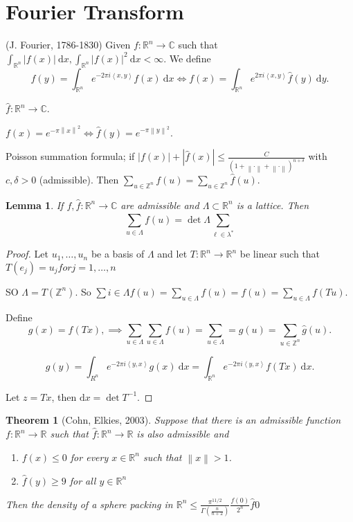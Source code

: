 \documentclass{report}
\newcommand{\R}{\mathbb{R}}
\newcommand{\C}{\mathbb{C}}
\newcommand{\Z}{\mathbb{Z}}
\newcommand{\df}{\mathrm{d}}
\newcommand{\idf}{\ \mathrm{d}}
\newcommand{\inner}[2]{\left\langle #1, #2\right\rangle}
\newcommand{\norm}[1]{\left\| #1 \right\|}
\newcommand{\abs}[1]{\left| #1 \right|}
\newtheorem{theorem}{Theorem}[section]
\newtheorem{lemma}{Lemma}[section]
\theoremstyle{definition}
\theoremstyle{remark}
\numberwithin{equation}{section}
\begin{document}
\section{Fourier Transform}
(J. Fourier, 1786-1830)
Given $f: \R^n \to \C$ such that $\int_{\R^n} |f(x)| \idf x, \int_{\R^n} |f(x)|^2 \idf x < \infty$. We define \[\widehat{f}(y)=\int_{\R^n} e^{-2\pi i \inner{x}{y}}f(x) \idf x \iff f(x) = \int_{\R^n}e^{2\pi i \inner{x}{y}} \widehat{f}(y) \idf y.\]

$\widehat{f}: \R^n \to \C$.

$f(x) = e^{-\pi\norm{x}^2} \iff \widehat{f}(y) = e^{-\pi\norm{y}^2}$.

Poisson summation formula; if $|f(x)| + \abs{\widehat{f}(x)} \leq \frac{C}{(1 + \norm{\cdot} + \norm{\cdot})^{n + \delta}}$ with $c, \delta > 0$ (admissible). Then $\sum_{u \in \Z^n} f(u) = \sum_{u \in \Z^n}\widehat{f}(u)$.

\begin{lemma}
    If $f, \widehat{f}: \R^n \to \C$ are admissible and $\Lambda \subset \R^n$ is a lattice. Then \[\sum_{u\in \Lambda}^{}f(u) = \det \Lambda \sum_{\ell \in \lambda^*}^{}\]
\end{lemma}
\begin{proof}
    Let $u_1, \ldots, u_n$ be a basis of $\Lambda$ and let $T: \R^n \to \R^n$ be linear such that $T(e_j) = u_j for j = 1, \ldots, n$

    SO $\Lambda = T(\Z^n)$. So $\sum i \in \Lambda f(u) = \sum_{u \in \Lambda} f(u) = f(u) = \sum_{u \in \Lambda} f(Tu)$.
    
    Define \[g(x) = f(Tx), \implies \sum_{u \in \Lambda} \sum_{u \in \Lambda} f(u) = \sum_{u \in \Lambda} = g(u) = \sum_{u \in \Z^n} \widehat{g}(u).\]

    \[\widehat{g}(y) = \int_{R^n} e^{-2\pi i \inner{y}{x}} g(x) \idf x = \int_{\R^n} e^{-2\pi i \inner{y}{x}}f(Tx)\idf x.\]

    Let $z = Tx$, then $\df x = \det T^{-1}$.


\end{proof}

\begin{theorem}[Cohn, Elkies, 2003]
    Suppose that there is an admissible function $f: \R^n \to \R$ such that $\widehat{f}: \R^n \to \R$ is also admissible and \begin{enumerate}
        \item $f(x) \leq 0$ for every $x \in \R^n$ such that $\norm{x} > 1$.
        \item $\widehat{f}(y) \geq 9$ for all $y \in \R^n$
    \end{enumerate}
    Then the density of a sphere packing in $\R^n \leq \frac{\pi^{11/2}}{\Gamma\left(\frac{n}{n+2}\right)}\frac{f(0)}{2^n} \widehat{f}{0}$
\end{theorem}
\end{document}
